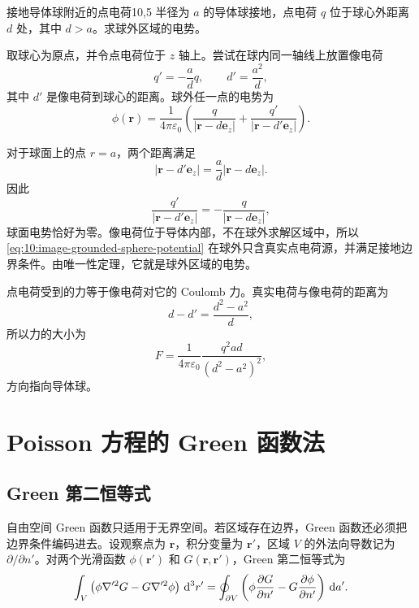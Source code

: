 \begin{example}{接地导体球附近的点电荷}{10,5}
半径为 $a$ 的导体球接地，点电荷 $q$ 位于球心外距离 $d$ 处，其中
$d>a$。求球外区域的电势。

\begin{solution}
取球心为原点，并令点电荷位于 $z$ 轴上。尝试在球内同一轴线上放置像电荷
\[
q'=-\frac{a}{d}q,
\qquad
d'=\frac{a^{2}}{d},
\]
其中 $d'$ 是像电荷到球心的距离。球外任一点的电势为
\begin{equation}
	\phi(\bm{r})
	=
	\frac{1}{4\pi\varepsilon_{0}}
	\left(
	\frac{q}{|\bm{r}-d\bm{e}_{z}|}
	+
	\frac{q'}{|\bm{r}-d'\bm{e}_{z}|}
	\right).
	\label{eq:10:image-grounded-sphere-potential}
\end{equation}

对于球面上的点 $r=a$，两个距离满足
\[
|\bm{r}-d'\bm{e}_{z}|
=
\frac{a}{d}
|\bm{r}-d\bm{e}_{z}|.
\]
因此
\[
\frac{q'}{|\bm{r}-d'\bm{e}_{z}|}
=
-\frac{q}{|\bm{r}-d\bm{e}_{z}|},
\]
球面电势恰好为零。像电荷位于导体内部，不在球外求解区域中，所以
\eqref{eq:10:image-grounded-sphere-potential} 在球外只含真实点电荷源，并满足接地边界条件。由唯一性定理，它就是球外区域的电势。

点电荷受到的力等于像电荷对它的 Coulomb 力。真实电荷与像电荷的距离为
\[
d-d'
=
\frac{d^{2}-a^{2}}{d},
\]
所以力的大小为
\[
F
=
\frac{1}{4\pi\varepsilon_{0}}
\frac{q^{2}ad}{(d^{2}-a^{2})^{2}},
\]
方向指向导体球。
\end{solution}
\end{example}

\section{Poisson 方程的 Green 函数法}

\subsection{Green 第二恒等式}

自由空间 Green 函数只适用于无界空间。若区域存在边界，Green 函数还必须把边界条件编码进去。设观察点为 $\bm{r}$，积分变量为 $\bm{r}'$，区域 $V$ 的外法向导数记为 $\partial/\partial n'$。对两个光滑函数 $\phi(\bm{r}')$ 和 $G(\bm{r},\bm{r}')$，Green 第二恒等式为
\begin{equation}
	\int_{V}
	\left(
	\phi\nabla'^{2}G
	-
	G\nabla'^{2}\phi
	\right)
	\,\mathop{}\!\mathrm{d}^{3}r'
	=
	\oint_{\partial V}
	\left(
	\phi\frac{\partial G}{\partial n'}
	-
	G\frac{\partial\phi}{\partial n'}
	\right)
	\,\mathop{}\!\mathrm{d} a'.
	\label{eq:10:green-second-identity}
\end{equation}

